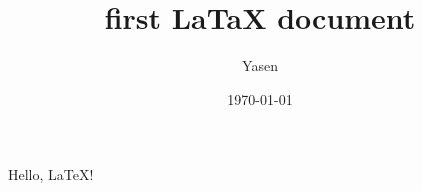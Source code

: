 \documentclass[]{article}	%
\title{first LaTaX document}
\author{Yasen}
\date{\today}
\begin{document}
	\maketitle
	Hello, LaTeX!
\end{document}
